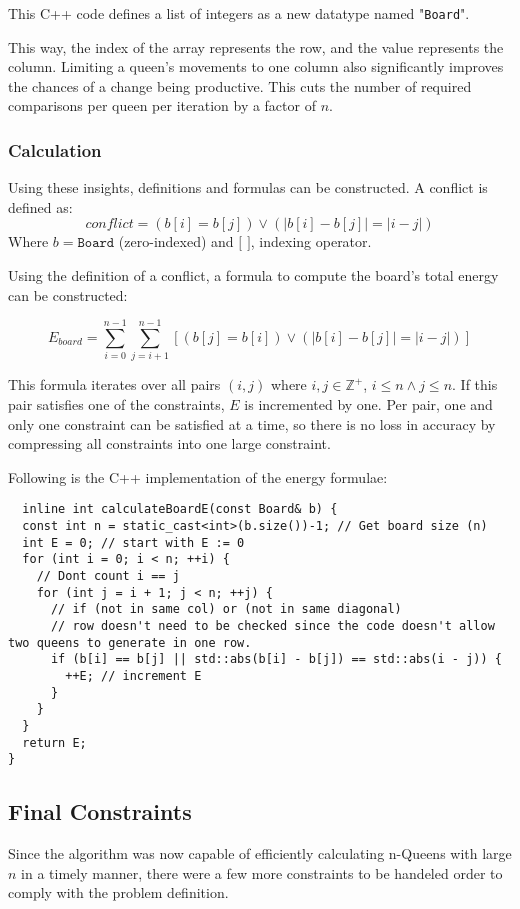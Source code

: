 \documentclass{article}
\begin{document}
This C++ code defines a list of integers as a new datatype named "\texttt{Board}".

This way, the index of the array represents the row, and the value represents the column.
Limiting a queen's movements to one column also significantly improves the chances of a change being productive.
This cuts the number of required comparisons per queen per iteration by a factor of $n$.

\subsubsection{Calculation}
Using these insights, definitions and formulas can be constructed.
A conflict is defined as:
\[
    conflict = \left(b[i] = b[j]\right) \lor \left( \left|b[i] - b[j]\right| = \left|i - j\right|\right)
\]
Where $b = \texttt{Board}$ (zero-indexed) and $[$  $]$, indexing operator.

\clearpage
Using the definition of a conflict, a formula to compute the board's total energy can be constructed:

\[
    E_{board} = \sum_{i=0}^{n-1} \sum_{j=i+1}^{n-1} \left[ (b[j] = b[i]) \lor \left( \left| b[i] - b[j] \right| = \left| i - j \right| \right) \right]
\]

This formula iterates over all pairs $(i, j)$ where $i, j \in \mathbb{Z}^+$, $i \leq n \land j \leq n$.
If this pair satisfies one of the constraints, $E$ is incremented by one.
Per pair, one and only one constraint can be satisfied at a time, so there is no loss in accuracy by compressing all constraints into one large constraint.

Following is the C++ implementation of the energy formulae:

\begin{lstlisting}
  inline int calculateBoardE(const Board& b) {
  const int n = static_cast<int>(b.size())-1; // Get board size (n)
  int E = 0; // start with E := 0
  for (int i = 0; i < n; ++i) {
    // Dont count i == j
    for (int j = i + 1; j < n; ++j) {
      // if (not in same col) or (not in same diagonal)
      // row doesn't need to be checked since the code doesn't allow two queens to generate in one row.
      if (b[i] == b[j] || std::abs(b[i] - b[j]) == std::abs(i - j)) {
        ++E; // increment E
      }
    }
  }
  return E;
}
\end{lstlisting}

\subsection{Final Constraints}
Since the algorithm was now capable of efficiently calculating n-Queens with large $n$ in a timely manner,
there were a few more constraints to be handeled order to comply with the problem definition.
\end{document}
